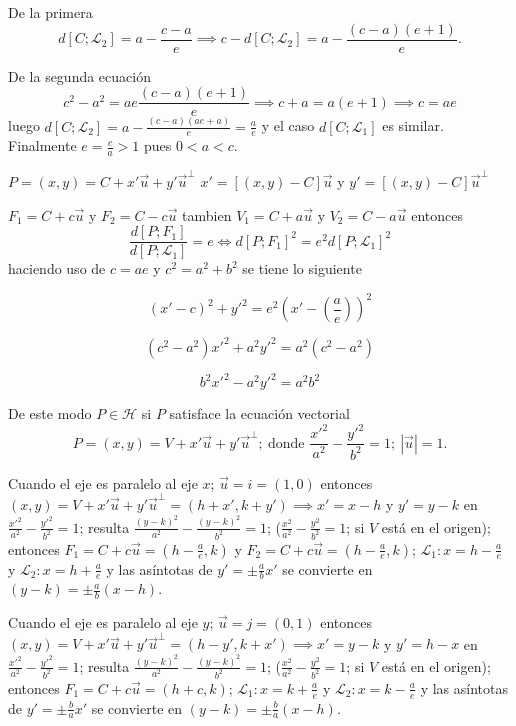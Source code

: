 \documentclass[12pt,]{report}
\theoremstyle{slplain}
\begin{document}
De la primera \[d\left[C;\mathcal{L}_2\right]=a-\frac{c-a}{e}\implies c-d\left[C;\mathcal{L}_2\right]=a-\frac{(c-a)(e+1)}{e}.\]

De la segunda ecuación \[c^2-a^2=ae\frac{(c-a)(e+1)}{e}\implies c+a=a(e+1)\implies c=ae\] luego \(d\left[C;\mathcal{L}_2\right]=a-\frac{(c-a)(ae+a)}{e}=\frac{a}{e}\) y el caso \(d\left[C;\mathcal{L}_1\right]\) es similar. Finalmente \(e=\frac{c}{a}>1\) pues \(0<a<c.\)

\(P=(x,y)=C+x'\vec{u}+y'\vec{u}^\perp\) \(x'=[(x,y)-C]\vec{u}\) y \(y'=[(x,y)-C]\vec{u}^\perp\)

\(F_1=C+c\vec{u}\) y \(F_2=C-c\vec{u}\) tambien \(V_1=C+a\vec{u}\) y \(V_2=C-a\vec{u}\) entonces \[\frac{d\left[P;F_1\right]}{d\left[P;\mathcal{L}_1\right]}=e\iff d\left[P;F_1\right]^2=e^2d\left[P;\mathcal{L}_1\right]^2\] haciendo uso de \(c=ae\) y \(c^2=a^2+b^2\) se tiene lo siguiente

\[(x'-c)^2+y'^2=e^2\left(x'-\left(\frac{a}{e}\right)\right)^2\]

\[(c^2-a^2) x'^2+a^2y'^2=a^2(c^2-a^2)\]

\[b^2x'^2-a^2y'^2=a^2b^2\]

De este modo \(P\in\mathcal{H}\) si \(P\) satisface la ecuación vectorial \[P=(x,y)=V+x'\vec{u}+y'\vec{u}^\perp;\: \text{donde } \frac{x'^2}{a^2}-\frac{y'^2}{b^2}=1; \:\left|\vec{u}\right|=1.\]

Cuando el eje es paralelo al eje \(x\); \(\vec{u}=i=(1,0)\) entonces \((x,y)=V+x'\vec{u}+y'\vec{u}^\perp=(h+x',k+y')\implies x'=x-h\) y \(y'=y-k\) en \(\frac{x'^2}{a^2}-\frac{y'^2}{b^2}=1\); resulta \(\frac{(y-k)^2}{a^2}-\frac{(y-k)^2}{b^2}=1\); (\(\frac{x^2}{a^2}-\frac{y^2}{b^2}=1\); si \(V\) está en el origen); entonces \(F_1=C+c\vec{u}=(h-\frac{a}{e},k)\) y \(F_2=C+c\vec{u}=(h-\frac{a}{e},k)\); \(\mathcal{L}_1: x=h-\frac{a}{e}\) y \(\mathcal{L}_2: x=h+\frac{a}{e}\) y las asíntotas de \(y'=\pm\frac{a}{b}x'\) se convierte en \((y-k)=\pm\frac{a}{b}(x-h)\).

Cuando el eje es paralelo al eje \(y\); \(\vec{u}=j=(0,1)\) entonces \((x,y)=V+x'\vec{u}+y'\vec{u}^\perp=(h-y',k+x')\implies x'=y-k\) y \(y'=h-x\) en \(\frac{x'^2}{a^2}-\frac{y'^2}{b^2}=1\); resulta \(\frac{(y-k)^2}{a^2}-\frac{(y-k)^2}{b^2}=1\); (\(\frac{x^2}{a^2}-\frac{y^2}{b^2}=1\); si \(V\) está en el origen); entonces \(F_1=C+c\vec{u}=(h+c,k)\); \(\mathcal{L}_1: x=k+\frac{a}{e}\) y \(\mathcal{L}_2: x=k-\frac{a}{e}\) y las asíntotas de \(y'=\pm\frac{b}{a}x'\) se convierte en \((y-k)=\pm\frac{b}{a}(x-h)\).


\end{document}
